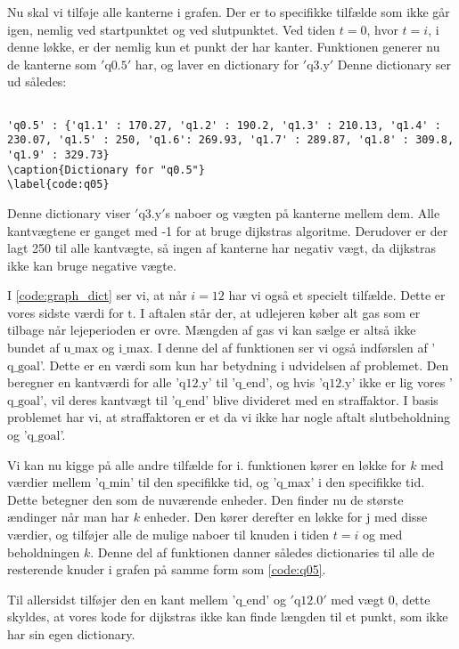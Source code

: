 Nu skal vi tilføje alle kanterne i grafen. Der er to specifikke tilfælde som ikke går igen, nemlig ved startpunktet og ved slutpunktet. Ved tiden $t=0$, hvor $t=i$, i denne løkke, er der nemlig kun et punkt der har kanter. Funktionen generer nu de kanterne som $'\textrm{q0.5}'$ har, og laver en dictionary for $'\textrm{q3.y}'$ 
Denne dictionary ser ud således:

\begin{lstlisting}

'q0.5' : {'q1.1' : 170.27, 'q1.2' : 190.2, 'q1.3' : 210.13, 'q1.4' : 230.07, 'q1.5' : 250, 'q1.6': 269.93, 'q1.7' : 289.87, 'q1.8' : 309.8, 'q1.9' : 329.73}
\caption{Dictionary for "q0.5"}
\label{code:q05}
\end{lstlisting}
Denne dictionary viser $'\textrm{q3.y}'$s naboer og vægten på kanterne mellem dem. Alle kantvægtene er ganget med -1 for at bruge dijkstras algoritme. Derudover er der lagt 250 til alle kantvægte, så ingen af kanterne har negativ vægt, da dijkstras ikke kan bruge negative vægte.

I \autoref{code:graph_dict} ser vi, at når $i=12$ har vi også et specielt tilfælde. Dette er vores sidste værdi for $\textrm{t}$. I aftalen står der, at udlejeren køber alt gas som er tilbage når lejeperioden er ovre.   Mængden af gas vi kan sælge er altså ikke bundet af $\textrm{u\_max}$ og $\textrm{i\_max}$. I denne del af funktionen ser vi også indførslen af '$\textrm{q\_goal}$'. Dette er en værdi som kun har betydning i udvidelsen af problemet. Den beregner  en kantværdi for alle '$\textrm{q12.y}$' til '$\textrm{q\_end}$', og hvis '$\textrm{q12.y}$' ikke er lig vores '$\textrm{q\_goal}$', vil deres kantvægt til '$\textrm{q\_end}$' blive divideret med en straffaktor. I basis problemet har vi, at straffaktoren er et da vi ikke har nogle aftalt slutbeholdning og '$\textrm{q\_goal}$'.

Vi kan nu kigge på alle andre tilfælde for i. funktionen kører en løkke for $k$ med værdier mellem '$\textrm{q\_min}$' til den specifikke tid, og '$\textrm{q\_max}$' i den specifikke tid. Dette betegner den som de nuværende enheder.
Den finder nu de største ændinger når man har $k$ enheder. Den kører derefter en løkke for $\textrm{j}$ med disse værdier, og tilføjer alle de mulige naboer til knuden i tiden $t=i$ og med beholdningen $k$. Denne del af funktionen danner således dictionaries til alle de resterende knuder i grafen på samme form som \autoref{code:q05}.

Til allersidst tilføjer den en kant mellem '$\textrm{q\_end}$' og $'\textrm{q12.0}'$ med vægt $0$, dette skyldes, at vores kode for dijkstras ikke kan finde længden til et punkt, som ikke har sin egen dictionary.

